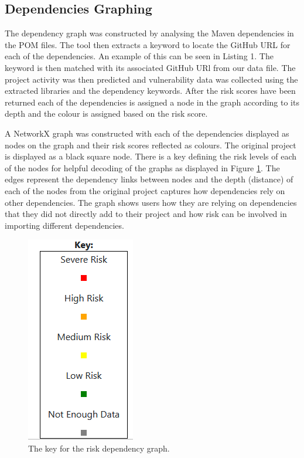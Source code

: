 \documentclass[conference]{IEEEtran}
\begin{document}
\subsection{Dependencies Graphing}
The dependency graph was constructed by analysing the Maven dependencies in the POM files. The tool then extracts a keyword to locate the GitHub URL for each of the dependencies. An example of this can be seen in Listing 1. The keyword is then matched with its associated GitHub URl from our data file. The project activity was then predicted and vulnerability data was collected using the extracted libraries and the dependency keywords. After the risk scores have been returned each of the dependencies is assigned a node in the graph according to its depth and the colour is assigned based on the risk score.

A NetworkX graph was constructed with each of the dependencies displayed as nodes on the graph and their risk scores reflected as colours. The original project is displayed as a black square node. There is a key defining the risk levels of each of the nodes for helpful decoding of the graphs as displayed in Figure \ref{fig:key}. The edges represent the dependency links between nodes and the depth (distance) of each of the nodes from the original project captures how dependencies rely on other dependencies. The graph shows users how they are relying on dependencies that they did not directly add to their project and how risk can be involved in importing different dependencies. 

\begin{figure}
\begin{center}
    \includegraphics[scale=0.5]{Key.png}
    \caption{The key for the risk dependency graph.}
    \label{fig:key}
\end{center}
\end{figure}
\end{document}
